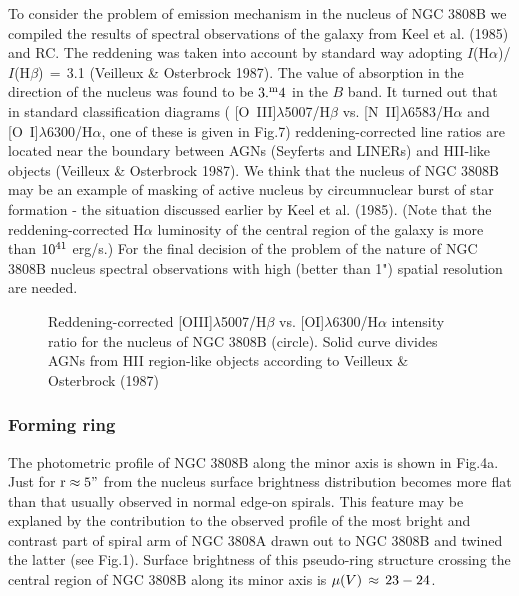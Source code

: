 To consider the problem of emission mechanism in the nucleus of NGC 3808B
we compiled the results of spectral observations of the galaxy from
Keel et al. (1985) and RC. The reddening was taken into account by
standard way adopting $I$(H$\alpha$)/$I$(H$\beta$)$\,=\,$3.1 (Veilleux
\& Osterbrock 1987). The value of absorption in the direction of the 
nucleus was found to be $\rm 3.^{m}4$ in the $B$ band. It turned out
that in standard classification
diagrams ( [O~III]$\lambda$5007/H$\beta$ vs. [N~II]$\lambda$6583/H$\alpha$
and [O~I]$\lambda$6300/H$\alpha$, one of these is given in Fig.7) 
reddening-corrected line ratios are located near
the boundary between AGNs (Seyferts and LINERs) and HII-like
objects (Veilleux \& Osterbrock 1987). We think that the nucleus of
NGC 3808B may be an example of masking of active nucleus by circumnuclear
burst of star formation - the situation discussed earlier by 
Keel et al. (1985).
(Note that the reddening-corrected H$\alpha$ luminosity of the central
region of the galaxy is more than $\rm 10^{41}$ erg/s.) For the final
decision of the problem of the nature of NGC 3808B nucleus spectral
observations with high (better than 1") spatial resolution are needed.

\begin{figure}
\picplace{1.5cm}
\caption[7]{Reddening-corrected 
[OIII]$\lambda$5007/H$\beta$ vs. [OI]$\lambda$6300/H$\alpha$
intensity ratio
for the nucleus of NGC 3808B (circle). Solid curve divides AGNs from
HII region-like objects according to Veilleux \& Osterbrock (1987)}
\end{figure}

\subsubsection{Forming ring}

The photometric profile of NGC 3808B along the minor axis is shown in
Fig.4a. Just for $\rm r\approx5"$ from the nucleus surface 
brightness distribution becomes more flat than that usually observed in
normal edge-on spirals. This feature may be explaned by the contribution
to the observed profile of the most bright and contrast part of spiral
arm of NGC 3808A drawn out to NGC 3808B and twined the latter (see Fig.1).
Surface brightness of this pseudo-ring structure crossing the central
region of NGC 3808B along its minor axis is $\mu(V)\,\approx\rm\,23-24$.

